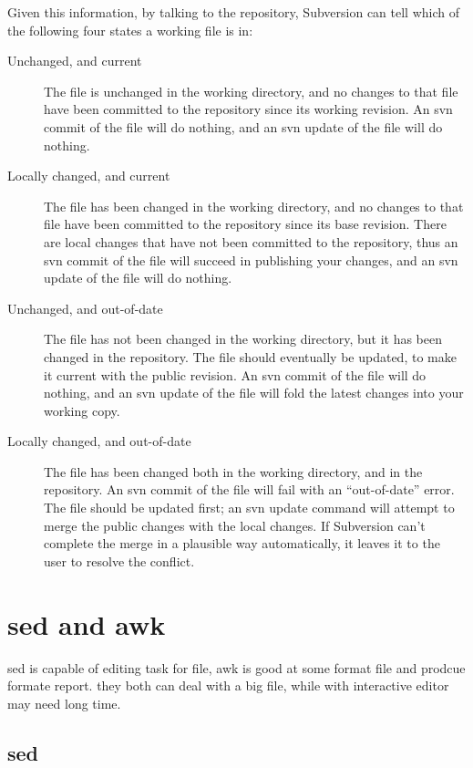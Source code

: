 \documentclass[a4paper,12pt,twoside]{book}
\begin{document}
\begin{CJK*}{UTF8}{song}
Given this information, by talking to the repository, Subversion can tell which of the following four states a working file is in:
\begin{description}
\item[Unchanged, and current]
The file is unchanged in the working directory, and no changes to that file have been committed to the repository since its working revision. An svn commit of the file will do nothing, and an svn update of the file will do nothing.
\item[Locally changed, and current]
The file has been changed in the working directory, and no changes to that file have been committed to the repository since its base revision. There are local changes that have not been committed to the repository, thus an svn commit of the file will succeed in publishing your changes, and an svn update of the file will do nothing.
\item[Unchanged, and out-of-date]
The file has not been changed in the working directory, but it has been changed in the repository. The file should eventually be updated, to make it current with the public revision. An svn commit of the file will do nothing, and an svn update of the file will fold the latest changes into your working copy.
\item[Locally changed, and out-of-date]
The file has been changed both in the working directory, and in the repository. An svn commit of the file will fail with an ``out-of-date'' error. The file should be updated first; an svn update command will attempt to merge the public changes with the local changes. If Subversion can't complete the merge in a plausible way automatically, it leaves it to the user to resolve the conflict.	
\end{description}


\section{sed and awk}
sed is capable of editing task for file, awk is good at some format file and prodcue formate report.
they both can deal with a big file, while with interactive editor may need long time.
\subsection{sed}

\end{CJK*}
\end{document}
